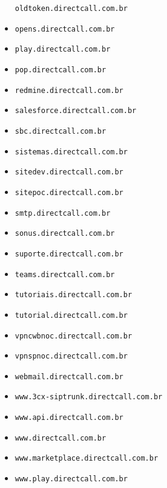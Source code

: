 \begin{multicols}{2}
\begin{itemize}
\texttt{oldtoken.directcall.com.br}\item \texttt{opens.directcall.com.br}\item \texttt{play.directcall.com.br}\item \texttt{pop.directcall.com.br}\item \texttt{redmine.directcall.com.br}\item \texttt{salesforce.directcall.com.br}\item \texttt{sbc.directcall.com.br}\item \texttt{sistemas.directcall.com.br}\item \texttt{sitedev.directcall.com.br}\item \texttt{sitepoc.directcall.com.br}\item \texttt{smtp.directcall.com.br}\item \texttt{sonus.directcall.com.br}\item \texttt{suporte.directcall.com.br}\item \texttt{teams.directcall.com.br}\item \texttt{tutoriais.directcall.com.br}\item \texttt{tutorial.directcall.com.br}\item \texttt{vpncwbnoc.directcall.com.br}\item \texttt{vpnspnoc.directcall.com.br}\item \texttt{webmail.directcall.com.br}\item \texttt{www.3cx-siptrunk.directcall.com.br}\item \texttt{www.api.directcall.com.br}\item \texttt{www.directcall.com.br}\item \texttt{www.marketplace.directcall.com.br}\item \texttt{www.play.directcall.com.br}
\end{itemize}
\end{multicols}
